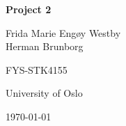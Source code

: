 \begin{titlepage}
   \begin{center}
        \vspace{2cm}

        {\LARGE \textbf{Project 2}}

        \vspace{3em}

        Frida Marie Engøy Westby \\
        Herman Brunborg


        \vspace{0.5em}

        FYS-STK4155

        \vspace{0.5em}

        University of Oslo

        \vfill

        \today
   \end{center}
\end{titlepage}
